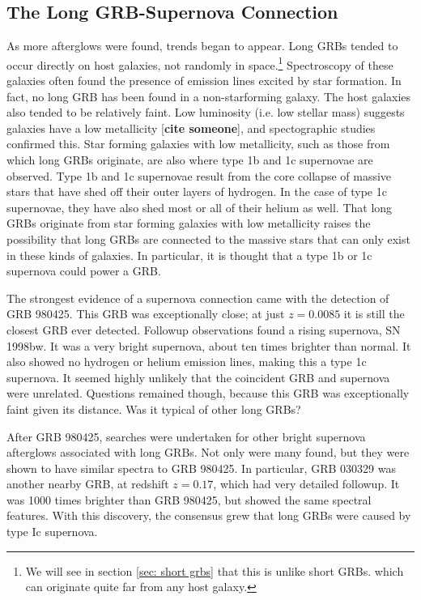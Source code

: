 \documentclass[11pt]{cuthesis}
\begin{document}
\subsection{The Long GRB-Supernova Connection}
As more afterglows were found, trends began to appear. Long GRBs tended to occur directly on host galaxies, not randomly in space.\footnote{We will see in section \ref{sec: short grbs} that this is unlike short GRBs. which can originate quite far from any host galaxy.} Spectroscopy of these galaxies often found the presence of emission lines excited by star formation. In fact, no long GRB has been found in a non-starforming galaxy. The host galaxies also tended to be relatively faint. Low luminosity (i.e. low stellar mass) suggests galaxies have a low metallicity [\textbf{cite someone}], and spectographic studies confirmed this. Star forming galaxies with low metallicity, such as those from which long GRBs originate, are also where type 1b and 1c supernovae are observed. Type 1b and 1c supernovae result from the core collapse of massive stars that have shed off their outer layers of hydrogen. In the case of type 1c supernovae, they have also shed most or all of their helium as well. That long GRBs originate from star forming galaxies with low metallicity raises the possibility that long GRBs are connected to the massive stars that can only exist in these kinds of galaxies. In particular, it is thought that a type 1b or 1c supernova could power a GRB.

The strongest evidence of a supernova connection came with the detection of GRB 980425. This GRB was exceptionally close; at just $z=0.0085$ it is still the closest GRB ever detected. Followup observations found a rising supernova, SN 1998bw. It was a very bright supernova, about ten times brighter than normal. It also showed no hydrogen or helium emission lines, making this a type 1c supernova. It seemed highly unlikely that the coincident GRB and supernova were unrelated. Questions remained though, because this GRB was exceptionally faint given its distance. Was it typical of other long GRBs? 

After GRB 980425, searches were undertaken for other bright supernova afterglows associated with long GRBs. Not only were many found, but they were shown to have similar spectra to GRB 980425. In particular, GRB 030329 was another nearby GRB, at redshift $z=0.17$, which had very detailed followup. It was 1000 times brighter than GRB 980425, but showed the same spectral features. With this discovery, the consensus grew that long GRBs were caused by type Ic supernova.
\end{document}
